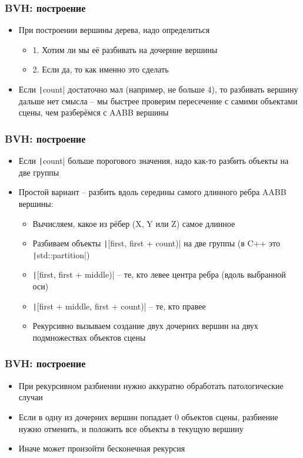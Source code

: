 \documentclass[handout,10pt]{beamer}
\begin{document}
\begin{frame}[fragile]
\frametitle{BVH: построение}
\begin{itemize}
\item При построении вершины дерева, надо определиться
\pause
\begin{itemize}
\item 1. Хотим ли мы её разбивать на дочерние вершины
\pause
\item 2. Если да, то как именно это сделать
\end{itemize}
\pause
\item Если \texttt|count| достаточно мал (например, не больше 4), то разбивать вершину дальше нет смысла -- мы быстрее проверим пересечение с самими объектами сцены, чем разберёмся с AABB вершины
\end{itemize}
\end{frame}

\begin{frame}[fragile]
\frametitle{BVH: построение}
\begin{itemize}
\item Если \texttt|count| больше порогового значения, надо как-то разбить объекты на две группы
\pause
\item Простой вариант -- разбить вдоль середины самого длинного ребра AABB вершины:
\pause
\begin{itemize}
\item Вычисляем, какое из рёбер (X, Y или Z) самое длинное
\pause
\item Разбиваем объекты \texttt|[first, first + count)| на две группы (в C++ это \texttt|std::partition|)
\pause
\item \texttt|[first, first + middle)| -- те, кто левее центра ребра (вдоль выбранной оси)
\item \texttt|[first + middle, first + count)| -- те, кто правее
\pause
\item Рекурсивно вызываем создание двух дочерних вершин на двух подмножествах объектов сцены
\end{itemize}
\end{itemize}
\end{frame}

\begin{frame}[fragile]
\frametitle{BVH: построение}
\begin{itemize}
\item При рекурсивном разбиении нужно аккуратно обработать патологические случаи
\pause
\item Если в одну из дочерних вершин попадает 0 объектов сцены, разбиение нужно отменить, и положить все объекты в текущую вершину
\pause
\item Иначе может произойти бесконечная рекурсия
\end{itemize}
\end{frame}
\end{document}
